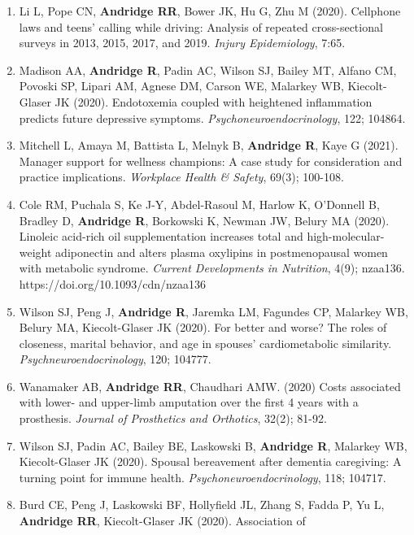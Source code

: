 \documentclass[
  english,
  letterpaper,
  DIV=11,
  numbers=noendperiod]{scrartcl}
\begin{document}
\begin{enumerate}
  CM, Povoski S, Lipari A, Malarkey WB, Kiecolt-Glaser JK (2021).
  Childhood abuse histories predict steeper inflammatory trajectories
  across time. \emph{Brain Behavior and Immunity}, 91; 541--545.
\item
  Li L, Pope CN, \textbf{Andridge RR}, Bower JK, Hu G, Zhu M (2020).
  Cellphone laws and teens' calling while driving: Analysis of repeated
  cross-sectional surveys in 2013, 2015, 2017, and 2019. \emph{Injury
  Epidemiology}, 7:65.
\item
  Madison AA, \textbf{Andridge R}, Padin AC, Wilson SJ, Bailey MT,
  Alfano CM, Povoski SP, Lipari AM, Agnese DM, Carson WE, Malarkey WB,
  Kiecolt-Glaser JK (2020). Endotoxemia coupled with heightened
  inflammation predicts future depressive symptoms.
  \emph{Psychoneuroendocrinology}, 122; 104864.
\item
  Mitchell L, Amaya M, Battista L, Melnyk B, \textbf{Andridge R}, Kaye G
  (2021). Manager support for wellness champions: A case study for
  consideration and practice implications. \emph{Workplace Health \&
  Safety}, 69(3); 100-108.
\item
  Cole RM, Puchala S, Ke J-Y, Abdel-Rasoul M, Harlow K, O'Donnell B,
  Bradley D, \textbf{Andridge R}, Borkowski K, Newman JW, Belury MA
  (2020). Linoleic acid-rich oil supplementation increases total and
  high-molecular-weight adiponectin and alters plasma oxylipins in
  postmenopausal women with metabolic syndrome. \emph{Current
  Developments in Nutrition}, 4(9); nzaa136.
  https://doi.org/10.1093/cdn/nzaa136
\item
  Wilson SJ, Peng J, \textbf{Andridge R}, Jaremka LM, Fagundes CP,
  Malarkey WB, Belury MA, Kiecolt-Glaser JK (2020). For better and
  worse? The roles of closeness, marital behavior, and age in spouses'
  cardiometabolic similarity. \emph{Psychneuroendocrinology}, 120;
  104777.
\item
  Wanamaker AB, \textbf{Andridge RR}, Chaudhari AMW. (2020) Costs
  associated with lower- and upper-limb amputation over the first 4
  years with a prosthesis. \emph{Journal of Prosthetics and Orthotics},
  32(2); 81-92.
\item
  Wilson SJ, Padin AC, Bailey BE, Laskowski B, \textbf{Andridge R},
  Malarkey WB, Kiecolt-Glaser JK (2020). Spousal bereavement after
  dementia caregiving: A turning point for immune health.
  \emph{Psychoneuroendocrinology}, 118; 104717.
\item
  Burd CE, Peng J, Laskowski BF, Hollyfield JL, Zhang S, Fadda P, Yu L,
  \textbf{Andridge RR}, Kiecolt-Glaser JK (2020). Association of

\end{enumerate}
\end{document}
